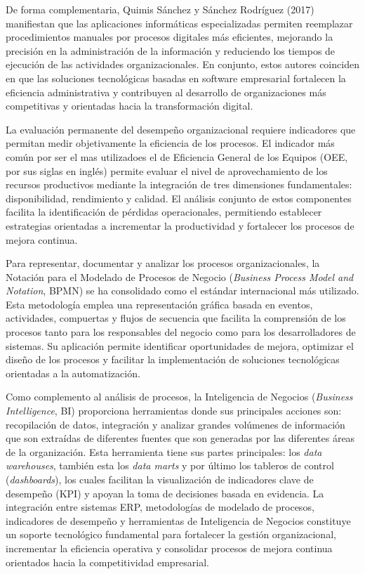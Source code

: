 De forma complementaria, Quimis Sánchez y Sánchez Rodríguez (2017) manifiestan que las aplicaciones informáticas especializadas permiten reemplazar procedimientos manuales por procesos digitales más eficientes, mejorando la precisión en la administración de la información y reduciendo los tiempos de ejecución de las actividades organizacionales. En conjunto, estos autores coinciden en que las soluciones tecnológicas basadas en software empresarial fortalecen la eficiencia administrativa y contribuyen al desarrollo de organizaciones más competitivas y orientadas hacia la transformación digital.

La evaluación permanente del desempeño organizacional requiere indicadores que permitan medir objetivamente la eficiencia de los procesos. El indicador más común por ser el mas utilizadoes el de Eficiencia General de los Equipos (OEE, por sus siglas en inglés) permite evaluar el nivel de aprovechamiento de los recursos productivos mediante la integración de tres dimensiones fundamentales: disponibilidad, rendimiento y calidad. El análisis conjunto de estos componentes facilita la identificación de pérdidas operacionales, permitiendo establecer estrategias orientadas a incrementar la productividad y fortalecer los procesos de mejora continua.

Para representar, documentar y analizar los procesos organizacionales, la Notación para el Modelado de Procesos de Negocio (\textit{Business Process Model and Notation}, BPMN) se ha consolidado como el estándar internacional más utilizado. Esta metodología emplea una representación gráfica basada en eventos, actividades, compuertas y flujos de secuencia que facilita la comprensión de los procesos tanto para los responsables del negocio como para los desarrolladores de sistemas. Su aplicación permite identificar oportunidades de mejora, optimizar el diseño de los procesos y facilitar la implementación de soluciones tecnológicas orientadas a la automatización.

Como complemento al análisis de procesos, la Inteligencia de Negocios (\textit{Business Intelligence}, BI) proporciona herramientas donde sus principales acciones son: recopilación de datos, integración y analizar grandes volúmenes de información que son extraídas de diferentes fuentes que son generadas por las diferentes áreas de la organización. Esta herramienta tiene sus partes principales: los \textit{data warehouses}, también esta los  \textit{data marts} y por último los tableros de control (\textit{dashboards}), los cuales facilitan la visualización de indicadores clave de desempeño (KPI) y apoyan la toma de decisiones basada en evidencia. La integración entre sistemas ERP, metodologías de modelado de procesos, indicadores de desempeño y herramientas de Inteligencia de Negocios constituye un soporte tecnológico fundamental para fortalecer la gestión organizacional, incrementar la eficiencia operativa y consolidar procesos de mejora continua orientados hacia la competitividad empresarial.

